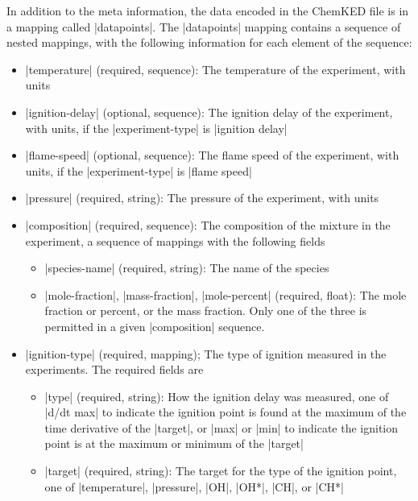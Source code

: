 \documentclass[12pt]{ussci}
\newcommand\ck{ChemKED}
\begin{document}
In addition to the meta information, the data encoded in the \ck{} file is in
a mapping called \yaml|datapoints|. The \yaml|datapoints| mapping contains a
sequence of nested mappings, with the following information for each element of
the sequence:
%
\begin{itemize}
    \item \yaml|temperature| (required, sequence): The temperature of the experiment, with units
    \item \yaml|ignition-delay| (optional, sequence): The ignition delay of the experiment, with units, if the \yaml|experiment-type| is \yaml|ignition delay|
    \item \yaml|flame-speed| (optional, sequence): The flame speed of the experiment, with units, if the \yaml|experiment-type| is \yaml|flame speed|
    \item \yaml|pressure| (required, string): The pressure of the experiment, with units
    \item \yaml|composition| (required, sequence): The composition of the mixture in the experiment, a sequence of mappings with the following fields
    \begin{itemize}
        \item \yaml|species-name| (required, string): The name of the species
        \item \yaml|mole-fraction|, \yaml|mass-fraction|, \yaml|mole-percent| (required, float): The mole fraction or percent, or the mass fraction. Only one of the three is permitted in a given \yaml|composition| sequence.
    \end{itemize}
    \item \yaml|ignition-type| (required, mapping); The type of ignition measured in the experiments. The required fields are
    \begin{itemize}
        \item \yaml|type| (required, string): How the ignition delay was measured, one of \yaml|d/dt max| to indicate the ignition point is found at the maximum of the time derivative of the \yaml|target|, or \yaml|max| or \yaml|min| to indicate the ignition point is at the maximum or minimum of the \yaml|target|
        \item \yaml|target| (required, string): The target for the type of the ignition point, one of \yaml|temperature|, \yaml|pressure|, \yaml|OH|, \yaml|OH*|, \yaml|CH|, or \yaml|CH*|
    \end{itemize}
\end{itemize}
\end{document}
